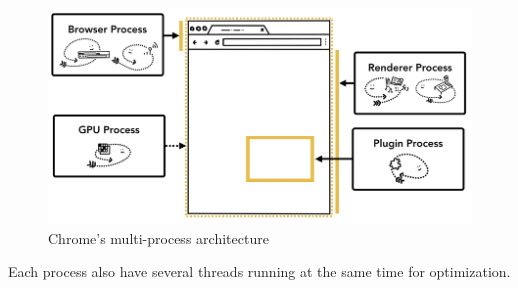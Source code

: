 \documentclass{kththesis}
\begin{document}
\begin{figure}
    \centering
    \includegraphics[width=13cm]{kththesis/Figures/chrome_architecture.png}
    \caption[Chrome's multi-process architecture]{Chrome's multi-process architecture \footnotemark}
    \label{fig:chrome_architecture}
\end{figure}


Each process also have several threads running at the same time for optimization.
 
\end{document}
